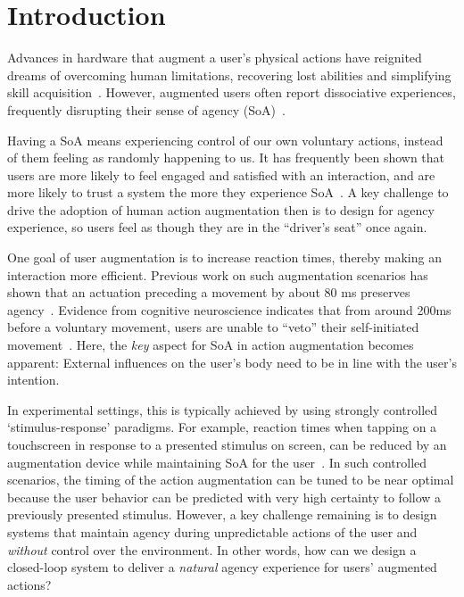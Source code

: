 \section{Introduction}
Advances in hardware that augment a user's physical actions have reignited dreams of overcoming human limitations, recovering lost abilities and simplifying skill acquisition~\citep{Goto2020-mw, Kunze2017-co}. However, augmented users often report dissociative experiences, frequently disrupting their sense of agency (SoA)~\citep{Gilbert2017-ze, Gilbert2019-uc}.

Having a SoA means experiencing control of our own voluntary actions, instead of them feeling as randomly happening to us. It has frequently been shown that users are more likely to feel engaged and satisfied with an interaction, and are more likely to trust a system the more they experience SoA~\citep{Berberian2012-do, Miller2007-rb}. A key challenge to drive the adoption of human action augmentation then is to design for agency experience, so users feel as though they are in the ``driver's seat'' once again.

One goal of user augmentation is to increase reaction times, thereby making an interaction more efficient. Previous work on such augmentation scenarios has shown that an actuation preceding a movement by about 80 ms preserves agency~\cite{Kasahara2019-sk}. Evidence from cognitive neuroscience indicates that from around 200ms before a voluntary movement, users are unable to ``veto'' their self-initiated movement~\cite{Schultze-Kraft2016-bx}. Here, the \textit{key} aspect for SoA in action augmentation becomes apparent: External influences on the user's body need to be in line with the user's intention. 

In experimental settings, this is typically achieved by using strongly controlled `stimulus-response' paradigms. For example, reaction times when tapping on a touchscreen in response to a presented stimulus on screen, can be reduced by an augmentation device while maintaining SoA for the user~\cite{Kasahara2019-sk, Kasahara2021-gy}. In such controlled scenarios, the timing of the action augmentation can be tuned to be near optimal because the user behavior can be predicted with very high certainty to follow a previously presented stimulus. However, a key challenge remaining is to design systems that maintain agency during unpredictable actions of the user and \textit{without} control over the environment. In other words, how can we design a closed-loop system to deliver a \textit{natural} agency experience for users' augmented actions?

